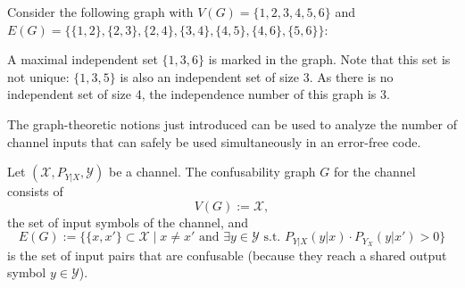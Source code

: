 \begin{example}
Consider the following graph with $V(G) = \{1,2,3,4,5,6\}$ and $E(G) = \{\{1,2\}, \{2,3\}, \{2,4\}, \{3,4\}, \{4,5\}, \{4,6\}, \{5,6\}\}$:
\begin{center}
\end{center}
A maximal independent set $\{1,3,6\}$ is marked in the graph. Note that this set is not unique: $\{1,3,5\}$ is also an independent set of size 3. As there is no independent set of size 4, the independence number of this graph is 3.
\end{example}
The graph-theoretic notions just introduced can be used to analyze the number of channel inputs that can safely be used simultaneously in an error-free code.
\begin{definition}
Let $(\mathcal{X},P_{Y|X},\mathcal{Y})$ be a channel. The confusability graph $G$ for the channel consists of
\[V(G) := \mathcal{X},\]
the set of input symbols of the channel, and
\[
E(G) := \{\{x,x'\} \subset \mathcal{X} \mid x \neq x' \mbox{ and } \exists y \in \mathcal{Y} \mbox{ s.t. } P_{Y|X}(y|x) \cdot P_{Y_X}(y|x') > 0\}
\]
is the set of input pairs that are confusable (because they reach a shared output symbol $y \in \mathcal{Y}$).
\end{definition}

